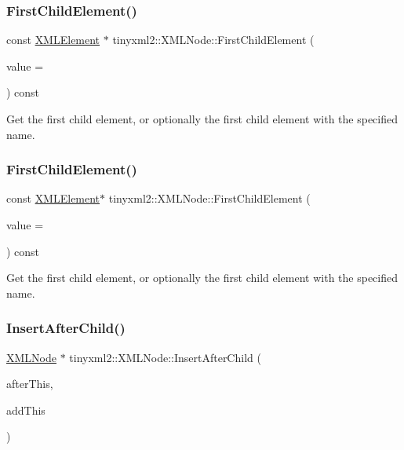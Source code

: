 \subsubsection{\texorpdfstring{First\+Child\+Element()}{FirstChildElement()}\hspace{0.1cm}{\footnotesize\ttfamily [1/2]}}
{\footnotesize\ttfamily const \hyperlink{classtinyxml2_1_1XMLElement}{X\+M\+L\+Element} $\ast$ tinyxml2\+::\+X\+M\+L\+Node\+::\+First\+Child\+Element (\begin{DoxyParamCaption}\item[{const char $\ast$}]{value = {} }\end{DoxyParamCaption}) const}

Get the first child element, or optionally the first child element with the specified name. \mbox{\label{classtinyxml2_1_1XMLNode_aa58edaa23984619930a3ab99b31fbf3d}} 
\subsubsection{\texorpdfstring{First\+Child\+Element()}{FirstChildElement()}\hspace{0.1cm}{\footnotesize\ttfamily [2/2]}}
{\footnotesize\ttfamily const \hyperlink{classtinyxml2_1_1XMLElement}{X\+M\+L\+Element}$\ast$ tinyxml2\+::\+X\+M\+L\+Node\+::\+First\+Child\+Element (\begin{DoxyParamCaption}\item[{const char $\ast$}]{value = {} }\end{DoxyParamCaption}) const}

Get the first child element, or optionally the first child element with the specified name. \mbox{\label{classtinyxml2_1_1XMLNode_a9275138a1b8dd5d8e2c26789bdc23ac8}} 
\subsubsection{\texorpdfstring{Insert\+After\+Child()}{InsertAfterChild()}\hspace{0.1cm}{\footnotesize\ttfamily [1/2]}}
{\footnotesize\ttfamily \hyperlink{classtinyxml2_1_1XMLNode}{X\+M\+L\+Node} $\ast$ tinyxml2\+::\+X\+M\+L\+Node\+::\+Insert\+After\+Child (\begin{DoxyParamCaption}\item[{\hyperlink{classtinyxml2_1_1XMLNode}{X\+M\+L\+Node} $\ast$}]{after\+This,  }\item[{\hyperlink{classtinyxml2_1_1XMLNode}{X\+M\+L\+Node} $\ast$}]{add\+This }\end{DoxyParamCaption})}

